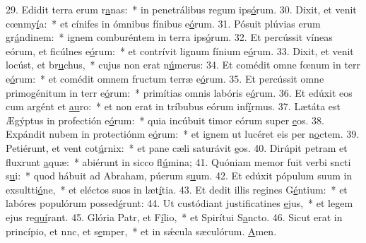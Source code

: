 29. Edidit terra erum r\uline{a}nas:~* in penetrálibus regum ips\uline{ó}rum.
30. Dixit, et venit cœnmy\uline{í}a:~* et cínifes in ómnibus fínibus e\uline{ó}rum.
31. Pósuit plúvias erum gr\uline{á}ndinem:~* ignem comburéntem in terra ips\uline{ó}rum.
32. Et percússit víneas eórum, et ficúlnes e\uline{ó}rum:~* et contrívit lignum fínium e\uline{ó}rum.
33. Dixit, et venit locúst, et br\uline{u}chus,~* cujus non erat n\uline{ú}merus:
34. Et comédit omne fœnum in terr e\uline{ó}rum:~* et comédit omnem fructum terræ e\uline{ó}rum.
35. Et percússit omne primogénitum in terr e\uline{ó}rum:~* primítias omnis labóris e\uline{ó}rum.
36. Et edúxit eos cum argént et \uline{au}ro:~* et non erat in tríbubus eórum inf\uline{í}rmus.
37. Lætáta est Ægýptus in profectión e\uline{ó}rum:~* quia incúbuit timor eórum super \uline{e}os.
38. Expándit nubem in protectiónm e\uline{ó}rum:~* et ignem ut lucéret eis per n\uline{o}ctem.
39. Petiérunt, et vent cot\uline{ú}rnix:~* et pane cæli saturávit \uline{e}os.
40. Dirúpit petram et fluxrunt \uline{a}quæ:~* abiérunt in sicco fl\uline{ú}mina;
41. Quóniam memor fuit verbi sncti s\uline{u}i:~* quod hábuit ad Abraham, púerum s\uline{u}um.
42. Et edúxit pópulum suum in exsultti\uline{ó}ne,~* et eléctos suos in læt\uline{í}tia.
43. Et dedit illis regines G\uline{é}ntium:~* et labóres populórum possed\uline{é}runt:
44. Ut custódiant justificatines \uline{e}jus,~* et legem ejus re\uline{quí}rant.
45. Glória Patr, et F\uline{í}lio,~* et Spirítui S\uline{a}ncto.
46. Sicut erat in princípio, et nnc, et s\uline{e}mper,~* et in sǽcula sæculórum. \uline{A}men.
